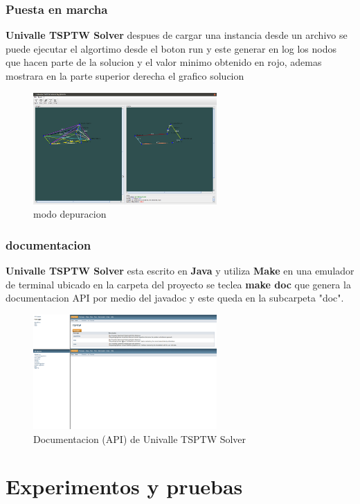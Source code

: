 \documentclass[journal, a4paper]{IEEEtran}
\begin{document}
\subsubsection{Puesta en marcha}
\textbf{Univalle TSPTW Solver} despues de cargar una instancia desde un archivo
se puede ejecutar el algortimo desde el boton run y este generar en log los nodos 
que hacen parte de la solucion y el valor minimo obtenido en rojo, ademas mostrara 
en la parte superior derecha el grafico solucion
\begin{figure}[H]
\centering
\includegraphics[width=70mm]{run.png}
  \caption{modo depuracion}
  \label{}
\end{figure}
\subsubsection{documentacion}
\textbf{Univalle TSPTW Solver} esta escrito en \textbf{Java} y utiliza \textbf{Make} en una emulador de terminal
ubicado en la carpeta del proyecto se teclea \textbf{make doc} que genera la documentacion API
por medio del javadoc y este queda en la subcarpeta "doc".
\begin{figure}[H]
\centering
  \includegraphics[width=70mm]{doc.png}
  \caption{Documentacion (API) de Univalle TSPTW Solver }
  \label{usando el comando make doc}
\end{figure}
\section{Experimentos y pruebas}
\end{document}

